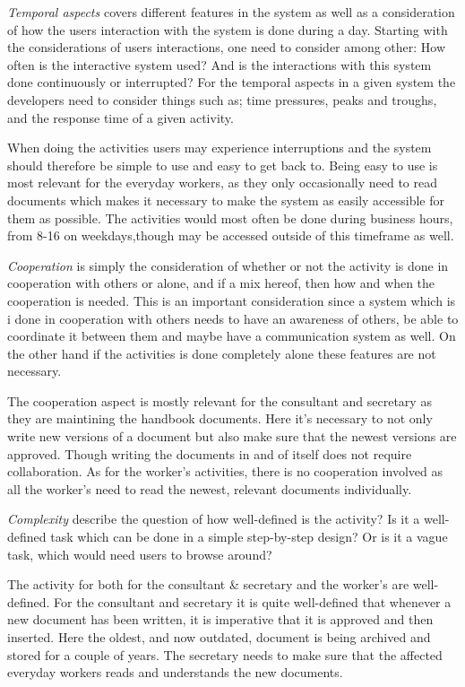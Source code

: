 \textit{Temporal aspects} covers different features in the system as well as a consideration of how the users interaction with the system is done during a day.
Starting with the considerations of users interactions, one need to consider among other: How often is the interactive system used? And is the interactions with this system done continuously or interrupted?
For the temporal aspects in a given system the developers need to consider things such as; time pressures, peaks and troughs, and the response time of a given activity.

When doing the activities users may experience interruptions and the system should therefore be simple to use and easy to get back to.
Being easy to use is most relevant for the everyday workers, as they only occasionally need to read documents which makes it necessary to make the system as easily accessible for them as possible.
The activities would most often be done during business hours, from 8-16 on weekdays,though may be accessed outside of this timeframe as well.

\textit{Cooperation} is simply the consideration of whether or not the activity is done in cooperation with others or alone, and if a mix hereof, then how and when the cooperation is needed.
This is an important consideration since a system which is i done in cooperation with others needs to have an awareness of others, be able to coordinate it between them and maybe have a communication system as well.
On the other hand if the activities is done completely alone these features are not necessary. 

The cooperation aspect is mostly relevant for the consultant and secretary as they are maintining the handbook documents. 
Here it's necessary to not only write new versions of a document but also make sure that the newest versions are approved. 
Though writing the documents in and of itself does not require collaboration.
As for the worker's activities, there is no cooperation involved as all the worker's need to read the newest, relevant documents individually.

\textit{Complexity} describe the question of how well-defined is the activity?
Is it a well-defined task which can be done in a simple step-by-step design?
Or is it a vague task, which would need users to browse around?

The activity for both for the consultant \& secretary and the worker's are well-defined. 
For the consultant and secretary it is quite well-defined that whenever a new document has been written, it is imperative that it is approved and then inserted.
Here the oldest, and now outdated, document is being archived and stored for a couple of years.
The secretary needs to make sure that the affected everyday workers reads and understands the new documents.


